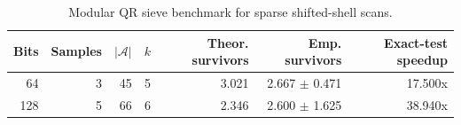 \begin{table}[htbp]
\centering
\caption{Modular QR sieve benchmark for sparse shifted-shell scans.}
\label{tab:sieve-benchmark}
\begin{tabular}{@{}rrrrrrr@{}}
\toprule
Bits & Samples & $|\mathcal A|$ & $k$ & Theor. survivors & Emp. survivors & Exact-test speedup \\
\midrule
64 & 3 & 45 & 5 & 3.021 & 2.667 $\pm$ 0.471 & 17.500x \\
128 & 5 & 66 & 6 & 2.346 & 2.600 $\pm$ 1.625 & 38.940x \\
\bottomrule
\end{tabular}
\end{table}
